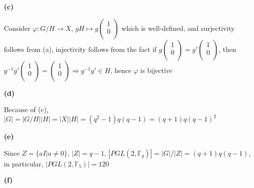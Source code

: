 \documentclass[10pt]{article}
\newcommand{\<}[1]{\langle #1 \rangle}
\begin{document}
\textbf{(c)} \par
Consider $\varphi:G/H\rightarrow X$, $gH\mapsto g\left( {\begin{array}{c}
   1 \\
   0 \\
  \end{array} } \right)$ which is well-defined, and surjectivity follows from (a), injectivity follows from the fact if $g\left( {\begin{array}{c}
   1 \\
   0 \\
  \end{array} } \right)=g'\left( {\begin{array}{c}
   1 \\
   0 \\
  \end{array} } \right)$, then $g^{-1}g'\left( {\begin{array}{c}
   1 \\
   0 \\
  \end{array} } \right)=\left( {\begin{array}{c}
   1 \\
   0 \\
  \end{array} } \right)\Rightarrow g^{-1}g'\in H$, hence $\varphi$ is bijective \par
\textbf{(d)} \par
Because of (c), $|G|=|G/H||H|=|X||H|=(q^2-1)q(q-1)=(q+1)q(q-1)^2$ \par
\textbf{(e)} \par
Since $Z=\{aI|a\neq0\}$, $|Z|=q-1$, $|PGL(2,\mathbb{F}_q)|=|G|/|Z|=(q+1)q(q-1)$, in particular, $|PGL(2,\mathbb{F}_5)|=120$ \par
\textbf{(f)} \par
\end{document}

